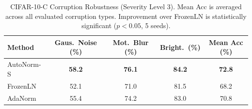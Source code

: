 \documentclass[conference]{IEEEtran}
\begin{document}
\begin{table}[t]
\centering
\caption{Performance on Penn TreeBank (PTB) POS Tagging and SST-2
  Sentiment Classification. PTB Perplexity is computed on POS tag
  sequences and is not comparable to language modeling perplexity
  (see Section~\ref{sec:nlp}).}
\label{tab:nlp_results}
\end{table}

\begin{table}[t]
\centering
\caption{CIFAR-10-C Corruption Robustness (Severity Level 3). Mean Acc
  is averaged across all evaluated corruption types. Improvement over
  FrozenLN is statistically significant ($p < 0.05$, 5 seeds).}
\label{tab:robustness}
\setlength{\tabcolsep}{10pt}
\begin{tabular}{lcccc}
\toprule
\textbf{Method}
  & \textbf{Gaus.\ Noise (\%)}
  & \textbf{Mot.\ Blur (\%)}
  & \textbf{Bright.\ (\%)}
  & \textbf{Mean Acc (\%)} \\
\midrule
AutoNorm-S & \textbf{58.2} & \textbf{76.1} & \textbf{84.2} & \textbf{72.8} \\
FrozenLN   & 52.1          & 71.0          & 81.5          & 68.2          \\
AdaNorm    & 55.4          & 74.2          & 83.0          & 70.8          \\
\bottomrule
\end{tabular}
\end{table}
\end{document}
